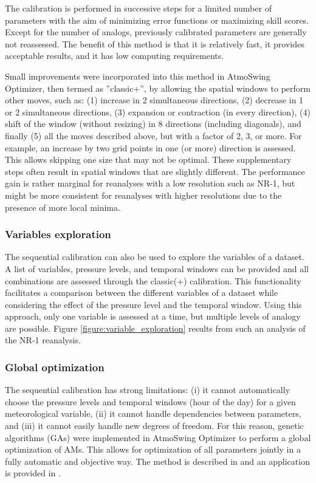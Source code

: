 \documentclass[gmdd]{copernicus}
\begin{document}
The calibration is performed in successive steps for a limited number of parameters with the aim of minimizing error functions or maximizing skill scores. Except for the number of analogs, previously calibrated parameters are generally not reassessed. The benefit of this method is that it is relatively fast, it provides acceptable results, and it has low computing requirements. 

Small improvements were incorporated into this method in AtmoSwing Optimizer, then termed as ''classic+'', by allowing the spatial windows to perform other moves, such as: (1) increase in 2 simultaneous directions, (2) decrease in 1 or 2 simultaneous directions, (3) expansion or contraction (in every direction), (4) shift of the window (without resizing) in 8 directions (including diagonals), and finally (5) all the moves described above, but with a factor of 2, 3, or more. For example, an increase by two grid points in one (or more) direction is assessed. This allows skipping one size that may not be optimal. These supplementary steps often result in spatial windows that are slightly different. The performance gain is rather marginal for reanalyses with a low resolution such as NR-1, but might be more consistent for reanalyses with higher resolutions due to the presence of more local minima.


\subsubsection{Variables exploration}
\label{sec:vars-explo}

The sequential calibration can also be used to explore the variables of a dataset. A list of variables, pressure levels, and temporal windows can be provided and all combinations are assessed through the classic(+) calibration. This functionality facilitates a comparison between the different variables of a dataset while considering the effect of the pressure level and the temporal window. Using this approach, only one variable is assessed at a time, but multiple levels of analogy are possible. Figure \ref{figure:variable_exploration} results from such an analysis of the NR-1 reanalysis. 


\subsubsection{Global optimization}
\label{sec:global-optimization}

The sequential calibration has strong limitations: (i) it cannot automatically choose the pressure levels and temporal windows (hour of the day) for a given meteorological variable, (ii) it cannot handle dependencies between parameters, and (iii) it cannot easily handle new degrees of freedom. For this reason, genetic algorithms (GAs) were implemented in AtmoSwing Optimizer to perform a global optimization of AMs. This allows for optimization of all parameters jointly in a fully automatic and objective way. The method is described in \citet{Horton2017a} and an application is provided in \citet{Horton2018a}.
\end{document}
